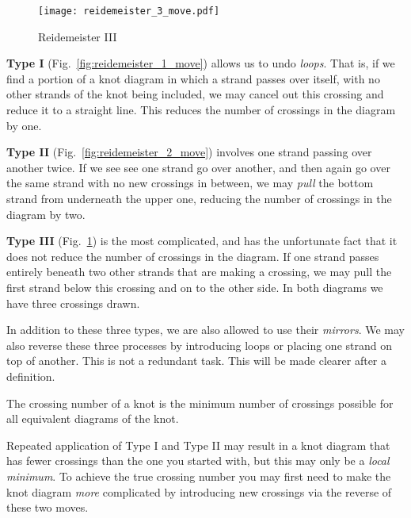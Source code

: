     \begin{figure}
        \centering
        \texttt{[image: reidemeister\_3\_move.pdf]}
        \caption{Reidemeister III}
        \label{fig:reidemeister_3_move}
    \end{figure}
    \textbf{Type I} (Fig.~\ref{fig:reidemeister_1_move}) allows us to undo
    \textit{loops}. That is, if we find a portion of a knot diagram in which
    a strand passes over itself, with no other strands of the knot being
    included, we may cancel out this crossing and reduce it to a straight
    line. This reduces the number of crossings in the diagram by one.
    \par\hfill\par
    \textbf{Type II} (Fig.~\ref{fig:reidemeister_2_move}) involves one strand
    passing over another twice. If we see see one strand go over another, and
    then again go over the same strand with no new crossings in between,
    we may \textit{pull} the bottom strand from underneath the upper one,
    reducing the number of crossings in the diagram by two.
    \par\hfill\par
    \textbf{Type III} (Fig.~\ref{fig:reidemeister_3_move}) is the most
    complicated, and has the unfortunate fact that it does not reduce the
    number of crossings in the diagram. If one strand passes entirely beneath
    two other strands that are making a crossing, we may pull the first
    strand below this crossing and on to the other side. In both diagrams we
    have three crossings drawn.
    \par\hfill\par
    In addition to these three types, we are also allowed to use their
    \textit{mirrors}. We may also reverse these three processes by introducing
    loops or placing one strand on top of another. This is not a redundant task.
    This will be made clearer after a definition.
    \begin{definition}
        The crossing number of a knot is the minimum number of crossings
        possible for all equivalent diagrams of the knot.
    \end{definition}
    Repeated application of Type I and Type II may result in
    a knot diagram that has fewer crossings than the one you started with, but
    this may only be a \textit{local minimum}. To achieve the true crossing
    number you may first need to make the knot diagram \textit{more}
    complicated by introducing new crossings via the reverse of these two moves.
